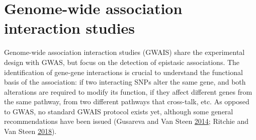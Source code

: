 \documentclass[
  11pt,
]{env/yjiao}
\begin{document}
\hypertarget{gwais}{%
\section{Genome-wide association interaction studies}\label{gwais}}

Genome-wide association interaction studies (GWAIS) share the experimental design with GWAS, but focus on the detection of epistasic associations. The identification of gene-gene interactions is crucial to understand the functional basis of the association: if two interacting SNPs alter the same gene, and both alterations are required to modify its function, if they affect different genes from the same pathway, from two different pathways that cross-talk, etc. As opposed to GWAS, no standard GWAIS protocol exists yet, although some general recommendations have been issued (Gusareva and Van Steen \protect\hyperlink{ref-gusareva_practical_2014}{2014}; Ritchie and Van Steen \protect\hyperlink{ref-ritchie_search_2018}{2018}).
\end{document}
